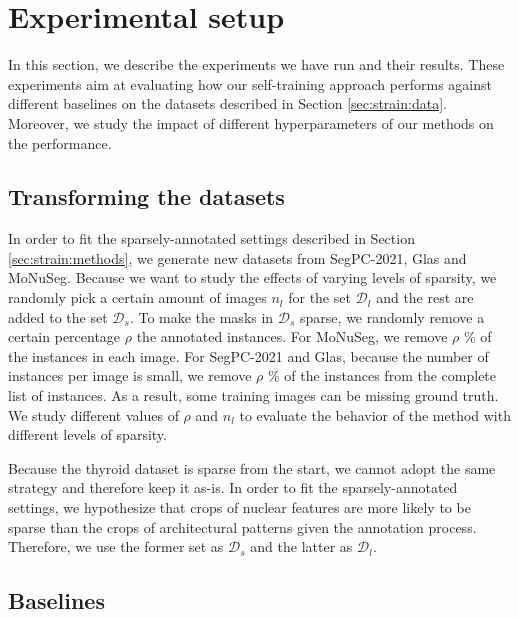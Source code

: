 \section{Experimental setup}
\label{sec:strain:experiments}

In this section, we describe the experiments we have run and their results. These experiments aim at evaluating how our self-training approach performs against different baselines on the datasets described in Section \ref{sec:strain:data}. Moreover, we study the impact of different hyperparameters of our methods on the performance.

\subsection{Transforming the datasets}

In order to fit the sparsely-annotated settings described in Section \ref{sec:strain:methods}, we generate new datasets from SegPC-2021, Glas and MoNuSeg. Because we want to study the effects of varying levels of sparsity, we randomly pick a certain amount of images $n_l$ for the set $\mathcal{D}_l$ and the rest are added to the set $\mathcal{D}_s$. To make the masks in $\mathcal{D}_s$ sparse, we randomly remove a certain percentage $\rho$ the annotated instances. For MoNuSeg, we remove $\rho$ \% of the instances in each image. For SegPC-2021 and Glas, because the number of instances per image is small, we remove $\rho$ \% of the instances from the complete list of instances. As a result, some training images can be missing ground truth. We study different values of $\rho$ and $n_l$ to evaluate the behavior of the method with different levels of sparsity.

Because the thyroid dataset is sparse from the start, we cannot adopt the same strategy and therefore keep it as-is. In order to fit the sparsely-annotated settings, we hypothesize that crops of nuclear features are more likely to be sparse than the crops of architectural patterns given the annotation process. Therefore, we use the former set as $\mathcal{D}_s$ and the latter as $\mathcal{D}_l$.

\subsection{Baselines}

